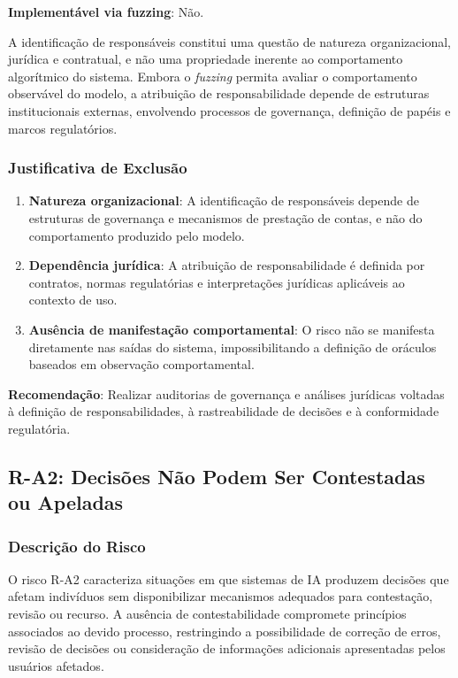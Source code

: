 \textbf{Implementável via fuzzing}: Não.

A identificação de responsáveis constitui uma questão de natureza organizacional, jurídica e contratual, e não uma propriedade inerente ao comportamento algorítmico do sistema. Embora o \textit{fuzzing} permita avaliar o comportamento observável do modelo, a atribuição de responsabilidade depende de estruturas institucionais externas, envolvendo processos de governança, definição de papéis e marcos regulatórios.

\subsubsection{Justificativa de Exclusão}

\begin{enumerate}
    \item \textbf{Natureza organizacional}: A identificação de responsáveis depende de estruturas de governança e mecanismos de prestação de contas, e não do comportamento produzido pelo modelo.

    \item \textbf{Dependência jurídica}: A atribuição de responsabilidade é definida por contratos, normas regulatórias e interpretações jurídicas aplicáveis ao contexto de uso.

    \item \textbf{Ausência de manifestação comportamental}: O risco não se manifesta diretamente nas saídas do sistema, impossibilitando a definição de oráculos baseados em observação comportamental.
\end{enumerate}

\textbf{Recomendação}: Realizar auditorias de governança e análises jurídicas voltadas à definição de responsabilidades, à rastreabilidade de decisões e à conformidade regulatória.

\subsection{R-A2: Decisões Não Podem Ser Contestadas ou Apeladas}

\subsubsection{Descrição do Risco}

O risco R-A2 caracteriza situações em que sistemas de IA produzem decisões que afetam indivíduos sem disponibilizar mecanismos adequados para contestação, revisão ou recurso. A ausência de contestabilidade compromete princípios associados ao devido processo, restringindo a possibilidade de correção de erros, revisão de decisões ou consideração de informações adicionais apresentadas pelos usuários afetados.

